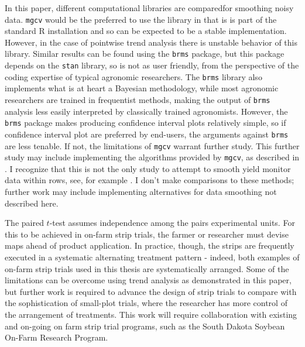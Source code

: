 \documentclass[phdcss]{SDSUThesis}
\begin{document}
In this paper, different computational libraries are comparedfor smoothing noisy data. \texttt{mgcv} would be the preferred to use the  library in that is is part of the standard R installation and so can be expected to be a stable implementation. However, in the case of pointwise trend analysis there is unstable behavior of this library. Similar results can be found using the \texttt{brms} package, but this package depends on the \texttt{stan} library, so is not as user friendly, from the perspective of the coding expertise of typical agronomic researchers. The \texttt{brms} library also implements what is at heart a Bayesian methodology, while most agronomic researchers are trained in frequentist methods, making the output of \texttt{brms} analysis less easily interpreted by classically trained agronomists. However, the \texttt{brms} package makes producing confidence interval plots relatively simple, so if confidence interval plot are preferred by end-users, the arguments against \texttt{brms} are less tenable. If not, the limitations of \texttt{mgcv} warrant further study. This further study may include implementing the algorithms provided by \texttt{mgcv}, as described in \cite{wood-2017}. I recognize that this is not the only study to attempt to smooth yield monitor data within rows, see, for example \cite{arslan-2002, whelan-2002, maldaner-2018}. I don't make comparisons to these methods; further work may include implementing alternatives for data smoothing not described here.

The paired $t$-test assumes independence among the pairs experimental units. For this to be achieved in on-farm strip trials, the farmer or researcher must devise maps ahead of product application. In practice, though, the strips are frequently executed in a systematic alternating treatment pattern - indeed, both examples of on-farm strip trials used in this thesis are systematically arranged. Some of the limitations can be overcome using trend analysis as demonstrated in this paper, but further work is required to advance the design of strip trials to compare with the sophistication of small-plot trials, where the researcher has more control of the arrangement of treatments. This work will require collaboration with existing and on-going on farm strip trial programs, such as the South Dakota Soybean On-Farm Research Program.
\end{document}
